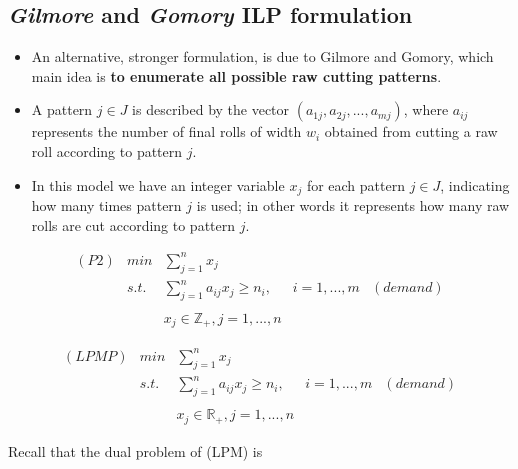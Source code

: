 \documentclass[10pt,a4paper]{article}
\begin{document}
\subsection{\textit{Gilmore} and \textit{Gomory} ILP formulation}

\begin{itemize}
\item An alternative, stronger formulation, is due to Gilmore and Gomory, which main idea is \textbf{to enumerate all possible raw cutting patterns}. 

\item A pattern $j \in J$ is described by the vector $(a_{1j},a_{2j},...,a_{mj})$, where $a_{ij}$ represents the number of final rolls of width $w_i$ obtained from cutting a raw roll according to pattern $j$. 

\item In this model we have an integer variable $x_j$ for each pattern $j \in J$, indicating how many times pattern $j$ is used; in other words it represents how many raw rolls are cut according to pattern $j$. 
\end{itemize}


\begin{equation}\label{eqn:P2}
\begin{array} {lllrr} 

(P2) & min & \displaystyle\sum_{j = 1}^{n} x_j && \\
& s.t. & \displaystyle\sum_{j = 1}^{n} a_{ij} x_j \geq n_i, & i = 1,...,m & (demand) \\\\

& & x_j \in \mathbb{Z}_{+}, j = 1,...,n  &&
\end{array}
\end{equation}


\begin{equation}\label{eqn:LPMP}
\begin{array} {lllrr} 

(LPMP) & min & \displaystyle\sum_{j = 1}^{n} x_j && \\
& s.t. & \displaystyle\sum_{j = 1}^{n} a_{ij} x_j \geq n_i, & i = 1,...,m & (demand) \\\\
& & x_j \in \mathbb{R}_{+}, j = 1,...,n  &&
\end{array}
\end{equation}

Recall that the dual problem of (LPM) is
\end{document}
